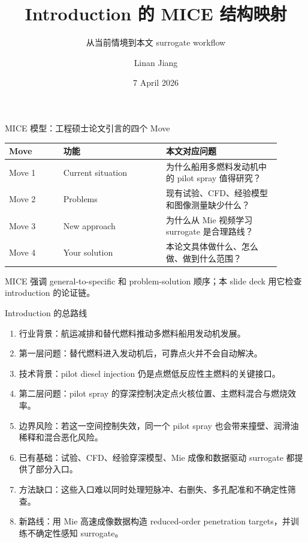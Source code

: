 \documentclass[aspectratio=169,11pt]{beamer}
\title[MICE Introduction Map]{Introduction 的 MICE 结构映射}
\subtitle{从当前情境到本文 surrogate workflow}
\author{Linan Jiang}
\institute{Aalto University}
\date{7 April 2026}
\newcommand{\claim}[1]{\textcolor{blue!65!black}{#1}}
\newcommand{\gaptext}[1]{\textcolor{red!65!black}{#1}}
\newcommand{\solutiontext}[1]{\textcolor{green!45!black}{#1}}
\begin{document}
\begin{frame}
  \titlepage
\end{frame}

\begin{frame}{MICE 模型：工程硕士论文引言的四个 Move}
\small
\begin{tabular}{L{0.18\linewidth}L{0.34\linewidth}L{0.38\linewidth}}
\toprule
Move & 功能 & 本文对应问题 \\
\midrule
Move 1 & Current situation & 为什么船用多燃料发动机中的 pilot spray 值得研究？ \\
Move 2 & Problems & 现有试验、CFD、经验模型和图像测量缺少什么？ \\
Move 3 & New approach & 为什么从 Mie 视频学习 surrogate 是合理路线？ \\
Move 4 & Your solution & 本论文具体做什么、怎么做、做到什么范围？ \\
\bottomrule
\end{tabular}

\vspace{0.7em}
\scriptsize
MICE 强调 general-to-specific 和 problem-solution 顺序；本 slide deck 用它检查 introduction 的论证链。
\end{frame}

\begin{frame}{Introduction 的总路线}
\footnotesize
\begin{enumerate}
  \item \claim{行业背景}：航运减排和替代燃料推动多燃料船用发动机发展。
  \item \gaptext{第一层问题}：替代燃料进入发动机后，可靠点火并不会自动解决。
  \item \claim{技术背景}：pilot diesel injection 仍是点燃低反应性主燃料的关键接口。
  \item \gaptext{第二层问题}：pilot spray 的穿深控制决定点火核位置、主燃料混合与燃烧效率。
  \item \gaptext{边界风险}：若这一空间控制失效，同一个 pilot spray 也会带来撞壁、润滑油稀释和混合恶化风险。
  \item \claim{已有基础}：试验、CFD、经验穿深模型、Mie 成像和数据驱动 surrogate 都提供了部分入口。
  \item \gaptext{方法缺口}：这些入口难以同时处理短脉冲、右删失、多孔配准和不确定性筛查。
  \item \solutiontext{新路线}：用 Mie 高速成像数据构造 reduced-order penetration targets，并训练不确定性感知 surrogate。
\end{enumerate}
\end{frame}
\end{document}
